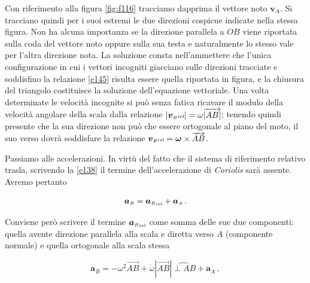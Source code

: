 \noindent Con riferimento alla figura \ref{fig:f116} tracciamo dapprima il vettore noto 
${{\bm v}_{\scriptscriptstyle{A}}}$. Si tracciano quindi per i suoi estremi
le due direzioni cospicue indicate nella stessa figura.
Non ha alcuna importanza se la direzione parallela a $OB$ viene riportata sulla
coda del vettore noto oppure sulla sua testa e naturalmente lo stesso vale per l'altra direzione nota.
La soluzione consta nell'ammettere
che l'unica configurazione in cui i vettori incogniti
giacciano sulle direzioni tracciate e soddisfino
la relazione \ref{e145} risulta essere quella
riportata in figura, e la chiusura del triangolo
costituisce la soluzione dell'equazione vettoriale.
Una volta determinate
le velocit\`a incognite
si pu\`o senza fatica ricavare
il modulo della velocit\`a angolare della scala
 dalla relazione
$|{{\bm v}_{\scriptscriptstyle{B}}\scriptscriptstyle{{\rm rel}}}|=\omega\overrightarrow{|{AB}|}$;
tenendo quindi presente che la sua direzione non pu\`o 
che essere ortogonale al piano del moto, il suo
verso dovr\`a soddisfare la relazione
${{\bm v}_{\scriptscriptstyle{B}}\scriptscriptstyle{{\rm rel}}}=\bm{\omega}\times\overrightarrow{AB}$. 


\noindent Passiamo alle accelerazioni. In virt\`u del fatto che il sistema di riferimento relativo trasla, scrivendo la \ref{e138} il termine dell'accelerazione di {\em Coriolis} sar\`a assente. 
Avremo pertanto


\begin{equation}
{{\bm a}_{\scriptscriptstyle{B}}}= 
{{\bm a}_{\scriptscriptstyle{B}}}_{\scriptscriptstyle{{\rm rel}}}+
{{\bm a}_{\scriptscriptstyle{A}}}\,.
\label{e146}
\end{equation}

\noindent Conviene per\`o scrivere il termine
${{\bm a}_{\scriptscriptstyle{B}}}_{\scriptscriptstyle{{\rm rel}}}$ come somma delle sue due
componenti: quella avente direzione parallela alla scala e diretta verso $A$ (componente normale) e quella ortogonale alla scala stessa

\begin{equation}
{{\bm a}_{\scriptscriptstyle{B}}}= 
-\omega^2 \overrightarrow{AB} + \dot{\omega}|\overrightarrow{AB}|\widehat{{\perp{AB}}}+
{{\bm a}_{\scriptscriptstyle{A}}}\,,
\label{e147}
\end{equation}

